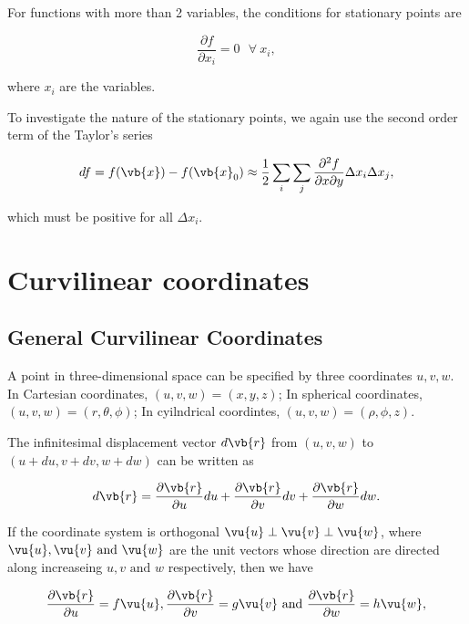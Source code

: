 \documentclass[english,a4paper,12pt]{report}
\begin{document}
For functions with more than 2 variables, the conditions for stationary points are 

\begin{equation}
    \frac{\partial f}{\partial x_{i} } = 0 ~~~\forall~ x_{i},
\end{equation}

where \(x_{i} \) are the variables. 

To investigate the nature of the stationary points, we again use the second order term of the Taylor's series

\begin{equation}
    df = f(\vb{x} ) - f(\vb{x} _{0} ) \approx \frac{1}{2}\sum_{i} \sum_{j} \frac{\partial^2 f}{\partial x \partial y} \Delta x_{i}\Delta x_{j},      
\end{equation}

which must be positive for all \(\Delta x_{i} \).

\section{Curvilinear coordinates}

\subsection{General Curvilinear Coordinates}

A point in three-dimensional space can be specified by three coordinates \(u,v,w\). In Cartesian coordinates, \((u,v,w) = (x,y,z)\); In spherical coordinates, \((u,v,w) = (r, \theta, \phi)\); In cyilndrical coordintes, \((u,v,w) = (\rho, \phi, z)\). 

The infinitesimal displacement vector \(d \vb{r} \)  from \((u,v,w)\) to \((u+du, v+dv, w+dw)\) can be written as

\begin{equation} 
	d\vb{r} = \frac{\partial \vb{r} }{\partial u} du + \frac{\partial \vb{r} }{\partial v}dv + \frac{\partial \vb{r} }{\partial w}dw. 
\end{equation}

If the coordinate system is orthogonal \ie \(\vu{u} \perp \vu{v} \perp \vu{w}\), where \(\vu{u} ,\vu{v} \text { and } \vu{w} \) are the unit vectors whose direction are directed along increaseing \(u, v \text { and } w\) respectively, then we have

\begin{equation}
    \frac{\partial \vb{r} }{\partial u} = f \vu{u}, \frac{\partial \vb{r} }{\partial v} = g \vu{v}  \text { and } \frac{\partial \vb{r} }{\partial w} = h \vu{w}  ,
\end{equation}
\end{document}
